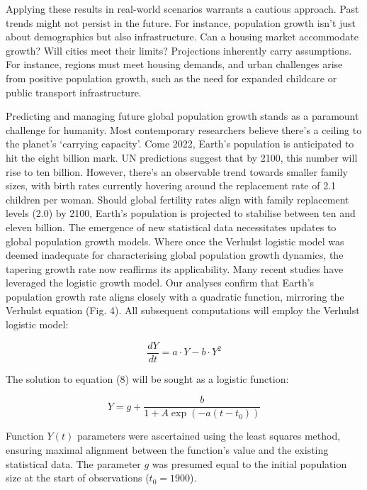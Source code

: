 Applying these results in real-world scenarios warrants a cautious approach.
Past trends might not persist in the future. For instance, population growth
isn't just about demographics but also infrastructure. Can a housing market
accommodate growth? Will cities meet their limits? Projections inherently carry
assumptions. For instance, regions must meet housing demands, and urban
challenges arise from positive population growth, such as the need for expanded
childcare or public transport infrastructure.

Predicting and managing future global population growth stands as a paramount
challenge for humanity. Most contemporary researchers believe there's a ceiling
to the planet's `carrying capacity'. Come 2022, Earth's population is
anticipated to hit the eight billion mark. UN predictions suggest that by 2100,
this number will rise to ten billion. However, there's an observable trend
towards smaller family sizes, with birth rates currently hovering around the
replacement rate of 2.1 children per woman. Should global fertility rates align
with family replacement levels (2.0) by 2100, Earth's population is projected
to stabilise between ten and eleven billion. The emergence of new statistical
data necessitates updates to global population growth models. Where once the
Verhulst logistic model was deemed inadequate for characterising global
population growth dynamics, the tapering growth rate now reaffirms its
applicability. Many recent studies have leveraged the logistic growth model.
Our analyses confirm that Earth's population growth rate aligns closely with a
quadratic function, mirroring the Verhulst equation (Fig. 4). All subsequent
computations will employ the Verhulst logistic model:

\begin{equation}
      \frac{dY}{dt} = a \cdot Y - b \cdot Y^2
\end{equation}

The solution to equation (8) will be sought as a logistic function:

\begin{equation}
      Y = g + \frac{b}{1 + A \exp(-a(t - t_0))}
\end{equation}

Function \( Y(t) \) parameters were ascertained using the least squares method,
ensuring maximal alignment between the function's value and the existing
statistical data. The parameter \( g \) was presumed equal to the initial
population size at the start of observations (\( t_0 =1900 \)).

